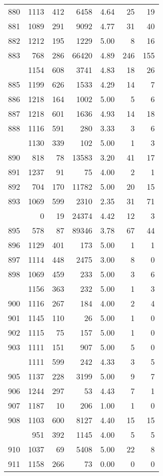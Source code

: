 \documentclass[
]{article}
\begin{document}
\begin{table}
\begin{tabular}[t]{lrrrrrr}
880 & 1113 & 412 & 6458 & 4.64 & 25 & 19\\
881 & 1089 & 291 & 9092 & 4.77 & 31 & 40\\
882 & 1212 & 195 & 1229 & 5.00 & 8 & 16\\
883 & 768 & 286 & 66420 & 4.89 & 246 & 155\\
\addlinespace
884 & 1154 & 608 & 3741 & 4.83 & 18 & 26\\
885 & 1199 & 626 & 1533 & 4.29 & 14 & 7\\
886 & 1218 & 164 & 1002 & 5.00 & 5 & 6\\
887 & 1218 & 601 & 1636 & 4.93 & 14 & 18\\
888 & 1116 & 591 & 280 & 3.33 & 3 & 6\\
\addlinespace
889 & 1130 & 339 & 102 & 5.00 & 1 & 3\\
890 & 818 & 78 & 13583 & 3.20 & 41 & 17\\
891 & 1237 & 91 & 75 & 4.00 & 2 & 1\\
892 & 704 & 170 & 11782 & 5.00 & 20 & 15\\
893 & 1069 & 599 & 2310 & 2.35 & 31 & 71\\
\addlinespace
894 & 0 & 19 & 24374 & 4.42 & 12 & 3\\
895 & 578 & 87 & 89346 & 3.78 & 67 & 44\\
896 & 1129 & 401 & 173 & 5.00 & 1 & 1\\
897 & 1114 & 448 & 2475 & 3.00 & 8 & 0\\
898 & 1069 & 459 & 233 & 5.00 & 3 & 6\\
\addlinespace
899 & 1156 & 363 & 232 & 5.00 & 1 & 3\\
900 & 1116 & 267 & 184 & 4.00 & 2 & 4\\
901 & 1145 & 110 & 26 & 5.00 & 1 & 0\\
902 & 1115 & 75 & 157 & 5.00 & 1 & 0\\
903 & 1111 & 151 & 907 & 5.00 & 5 & 0\\
\addlinespace
904 & 1111 & 599 & 242 & 4.33 & 3 & 5\\
905 & 1137 & 228 & 3199 & 5.00 & 9 & 7\\
906 & 1244 & 297 & 53 & 4.43 & 7 & 1\\
907 & 1187 & 10 & 206 & 1.00 & 1 & 0\\
908 & 1103 & 600 & 8127 & 4.40 & 15 & 15\\
\addlinespace
909 & 951 & 392 & 1145 & 4.00 & 5 & 5\\
910 & 1037 & 69 & 5408 & 5.00 & 22 & 8\\
911 & 1158 & 266 & 73 & 0.00 & 0 & 0\\

\end{tabular}
\end{table}
\end{document}

